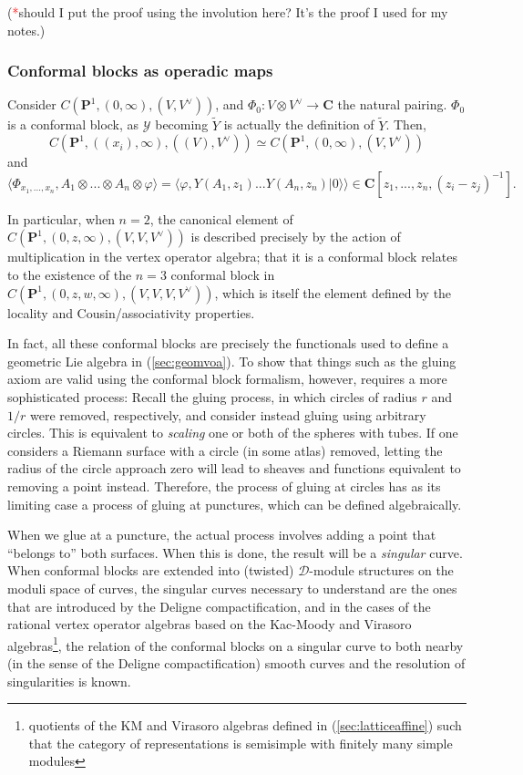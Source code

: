 \documentclass{article}
\newcommand{\CC}{\mathbold{C}}
\newcommand{\PP}{\mathbold{P}}
\newcommand{\vac}{|0\rangle}
\newcommand{\Dd}{\mathcal{D}}
\newcommand{\Yy}{\mathcal{Y}}
\newcommand{\tk}{\textcolor{red}{*}}
\begin{document}
(\tk should I put the proof using the involution here?  It's the proof I used for my notes.)

\subsubsection{Conformal blocks as operadic maps}
Consider $C(\PP^1,(0,\infty),(V,V^\vee))$, and $\Phi_0: V \otimes V^\vee \rightarrow \CC$ the natural pairing.  $\Phi_0$ is a conformal block, as $\Yy$ becoming $\widetilde{Y}$ is actually the definition of $\widetilde{Y}$.  Then,
\[C(\PP^1,((x_i),\infty),((V),V^\vee)) \simeq C(\PP^1,(0,\infty),(V,V^\vee))\]
and
\[\langle \Phi_{x_1,...,x_n},A_1 \otimes ... \otimes A_n \otimes \varphi \rangle = \langle \varphi, Y(A_1,z_1)...Y(A_n,z_n)\vac \rangle \in \CC[z_1,...,z_n,(z_i-z_j)^{-1}]. \]

In particular, when $n=2$, the canonical element of $C(\PP^1,(0,z,\infty),(V,V,V^\vee))$ is described precisely by the action of multiplication in the vertex operator algebra; that it is a conformal block relates to the existence of the $n=3$ conformal block in $C(\PP^1,(0,z,w,\infty),(V,V,V,V^\vee))$, which is itself the element defined by the locality and Cousin/associativity properties.

In fact, all these conformal blocks are precisely the functionals used to define a geometric Lie algebra in (\ref{sec:geomvoa}).  To show that things such as the gluing axiom are valid using the conformal block formalism, however, requires a more sophisticated process: Recall the gluing process, in which circles of radius $r$ and $1/r$ were removed, respectively, and consider instead gluing using arbitrary circles.  This is equivalent to \textit{scaling} one or both of the spheres with tubes.  If one considers a Riemann surface with a circle (in some atlas) removed, letting the radius of the circle approach zero will lead to sheaves and functions equivalent to removing a point instead.  Therefore, the process of gluing at circles has as its limiting case a process of gluing at punctures, which can be defined algebraically.

When we glue at a puncture, the actual process involves adding a point that ``belongs to'' both surfaces.  When this is done, the result will be a \textit{singular} curve.  When conformal blocks are extended into (twisted) $\Dd$-module structures on the moduli space of curves, the singular curves necessary to understand are the ones that are introduced by the Deligne compactification, and in the cases of the rational vertex operator algebras based on the Kac-Moody and Virasoro algebras\footnote{quotients of the KM and Virasoro algebras defined in (\ref{sec:latticeaffine}) such that the category of representations is semisimple with finitely many simple modules}, the relation of the conformal blocks on a singular curve to both nearby (in the sense of the Deligne compactification) smooth curves and the resolution of singularities is known.
\end{document}
